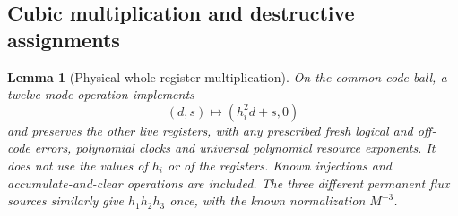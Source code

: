\documentclass[11pt,a4paper]{amsart}
\newtheorem{lemma}[theorem]{Lemma}
\theoremstyle{definition}
\theoremstyle{remark}
\numberwithin{equation}{section}
\begin{document}
\subsection{Cubic multiplication and destructive assignments}
\begin{lemma}[Physical whole-register multiplication]\label{lem:physical-multiply}
On the common code ball, a twelve-mode operation implements
\begin{equation}\label{eq:physical-destructive-assignment}
 (d,s)\longmapsto(h_i^2d+s,0)
\end{equation}
and preserves the other live registers, with any prescribed fresh logical
and off-code errors, polynomial clocks and universal polynomial resource
exponents.  It does not use the values of $h_i$ or of the registers.
Known injections and accumulate-and-clear operations are included.
The three different permanent flux sources similarly give $h_1h_2h_3$
once, with the known normalization $M^{-3}$.
\end{lemma}
\end{document}
